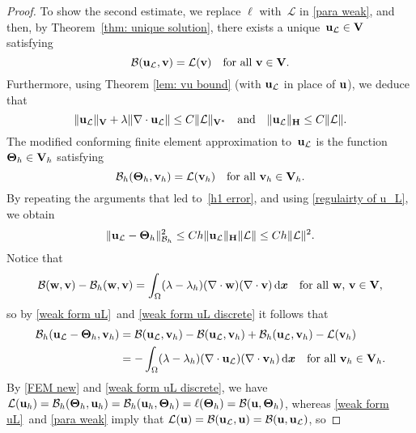 \documentclass[11pt]{article}
\newcommand{\calB}{\mathcal{B}}
\newcommand{\calL}{\mathcal{L}}
\newcommand{\vu}{{\bf u}}
\newcommand{\vv}{{\bf v}}
\newcommand{\vV}{{\bf V}}
\newcommand{\vw}{{\bf w}}
\newcommand{\bsx}{{\boldsymbol{x}}}
\numberwithin{equation}{section}
\newcommand{\ud}{\mathrm{d}}
\begin{document}
\begin{proof}
To show the second estimate, we replace $\ell$ with~$\calL$ in \eqref{para weak}, and then, by 
Theorem~\ref{thm: unique solution}, there exists a unique~$\vu_{\calL} \in \vV$ satisfying
\begin{equation}\label{weak form uL}
\calB(\vu_{\calL}, \vv) = \calL(\vv)\quad\text{for all $\vv \in \vV$.}
\end{equation}
Furthermore, using  Theorem \ref{lem: vu bound} (with $\vu_{\calL}$ in place of $\vu$), we deduce that  
\begin{equation}\label{regulairty of u_L}
    \|\vu_{\calL}\|_{\vV}+\lambda\|\nabla\cdot \vu_{\calL}\| \le C\|\calL\|_{\vV^*}\quad{\rm and}\quad 
\|\vu_{\calL}\|_{\bf H}\le C\|\calL\|.
\end{equation}
The modified conforming finite element approximation to~$\vu_{\calL}$ is the
function~$\mathbf{\Theta}_h\in\vV_h$ satisfying
\begin{equation}\label{weak form uL discrete}
\calB_h(\mathbf{\Theta}_h,\vv_h) = \calL(\vv_h)
\quad\text{for all $\vv_h \in\vV_h$.}
\end{equation}
By repeating the arguments that led to~\eqref{h1 error}, and using
\eqref{regulairty of u_L}, we obtain
\begin{equation}\label{projection estimate ucalL}
\|\vu_{\calL}-{\bf\Theta}_h\|_{\calB_h}^2
    \le Ch\|\vu_{\calL}\|_{\mathbf{H}}\|\calL\|\le Ch\|\calL\|^2.
\end{equation}
Notice that
\[
\calB(\vw,\vv)-\calB_h(\vw,\vv)
    =\int_\Omega (\lambda-\lambda_h)(\nabla\cdot\vw)(\nabla\cdot\vv)\,\ud\bsx
    \quad\text{for all $\vw$, $\vv\in\vV$,}
\]
so by \eqref{weak form uL}~and \eqref{weak form uL discrete} it follows that
\begin{equation}\label{uL relation}
\begin{aligned}
\calB_h(\vu_{\calL}-{\bf\Theta}_h,\vv_h)&=\calB(\vu_{\calL},\vv_h)
   -\calB(\vu_{\calL},\vv_h)+\calB_h(\vu_{\calL},\vv_h)-\calL(\vv_h)\\
   &=-\int_{\Omega}(\lambda-\lambda_h)
    (\nabla\cdot\vu_{\calL})(\nabla\cdot\vv_h)\,\ud\bsx
    \quad\text{for all $\vv_h \in\vV_h$.}
\end{aligned}
\end{equation}
By \eqref{FEM new} and \eqref{weak form uL discrete}, we have 
$\calL(\vu_h)=\calB_h(\mathbf{\Theta}_h,\vu_h)
=\calB_h(\vu_h,\mathbf{\Theta}_h)=\ell(\mathbf{\Theta}_h)
=\calB(\vu,\mathbf{\Theta}_h)$, whereas \eqref{weak form uL}~and \eqref{para
weak} imply that $\calL(\vu)=\calB(\vu_{\calL},\vu)=\calB(\vu,\vu_{\calL})$, so

\end{proof}
\end{document}

